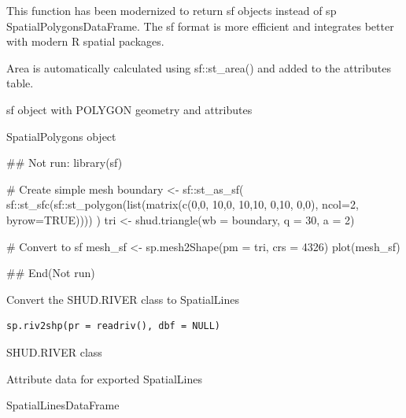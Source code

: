 \documentclass[a4paper]{book}
\begin{document}
%
\begin{Details}\relax
This function has been modernized to return sf objects instead of sp
SpatialPolygonsDataFrame. The sf format is more efficient and integrates
better with modern R spatial packages.

Area is automatically calculated using sf::st\_area() and added to the
attributes table.
\end{Details}
%
\begin{Value}
sf object with POLYGON geometry and attributes

SpatialPolygons object
\end{Value}
%
\begin{Examples}
\begin{ExampleCode}
## Not run: 
library(sf)

# Create simple mesh
boundary <- sf::st_as_sf(
  sf::st_sfc(sf::st_polygon(list(matrix(c(0,0, 10,0, 10,10, 0,10, 0,0),
                                         ncol=2, byrow=TRUE))))
)
tri <- shud.triangle(wb = boundary, q = 30, a = 2)

# Convert to sf
mesh_sf <- sp.mesh2Shape(pm = tri, crs = 4326)
plot(mesh_sf)

## End(Not run)
\end{ExampleCode}
\end{Examples}
%
\begin{Description}\relax
Convert the SHUD.RIVER class to SpatialLines
\end{Description}
%
\begin{Usage}
\begin{verbatim}
sp.riv2shp(pr = readriv(), dbf = NULL)
\end{verbatim}
\end{Usage}
%
\begin{Arguments}
\begin{ldescription}
\item[\code{pr}] SHUD.RIVER class

\item[\code{dbf}] Attribute data for exported SpatialLines
\end{ldescription}
\end{Arguments}
%
\begin{Value}
SpatialLinesDataFrame
\end{Value}
\end{document}
